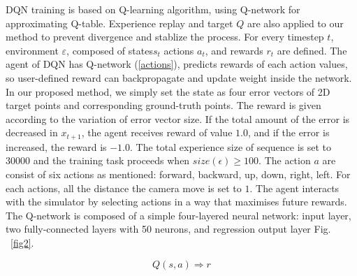 \documentclass[10pt]{article}
\begin{document}
DQN training is based on Q-learning\cite{ref1} algorithm, using Q-network for approximating Q-table. Experience replay and target $Q$ are also applied to our method to prevent divergence and  stablize the process. For every timestep $t$, environment $\varepsilon$, composed of states$s_t$ actions $a_t$, and rewards $r_t$ are defined. The agent of DQN has Q-network (\ref{actions}), predicts rewards of each action values, so user-defined reward can backpropagate and update weight inside the network\cite{ref2}. In our proposed method, we simply set the state as four error vectors of 2D target points and corresponding ground-truth points. The reward is given according to the variation of error vector size. If the total amount of the error is decreased in $x_{t+1}$, the agent receives reward of value $1.0$, and if the error is increased, the reward is $-1.0$. The total experience size of sequence is set to $30000$ and the training task proceeds when $size(\epsilon) \geq 100$. The action $a$ are consist of six actions as mentioned: forward, backward, up, down, right, left. For each actions, all the distance the camera move is set to $1$. The agent interacts with the simulator by selecting actions in a way that maximises future rewards. The Q-network is composed of a simple four-layered neural network: input layer, two fully-connected layers with 50 neurons, and regression output layer Fig. ~\ref{fig2}.

\begin{equation}\label{actions}
  Q(s, a) \Rightarrow r
\end{equation}
\end{document}
